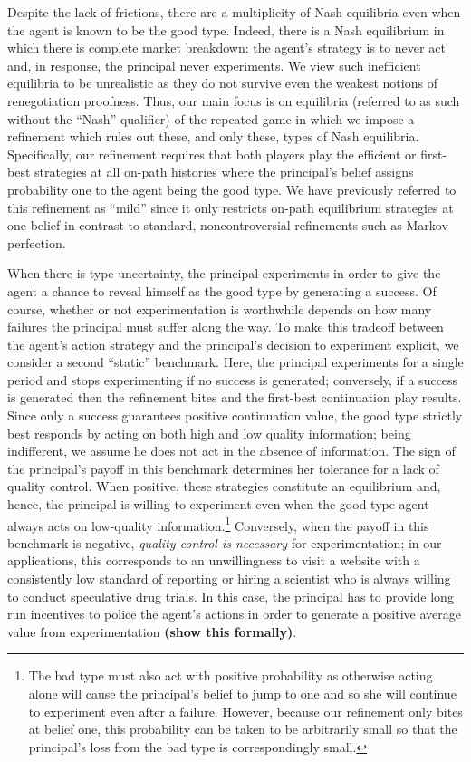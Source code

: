 \documentclass[11pt,reqno]{amsart}
\begin{document}
Despite the lack of frictions, there are a multiplicity of Nash equilibria even when the agent is known to be the good type. Indeed, there is a Nash equilibrium in which there is complete market breakdown: the agent's strategy is to never act and, in response, the principal never experiments. We view such inefficient equilibria to be unrealistic as they do not survive even the weakest notions of renegotiation proofness. Thus, our main focus is on equilibria (referred to as such without the ``Nash'' qualifier) of the repeated game in which we impose a refinement which rules out these, and only these, types of Nash equilibria. Specifically, our refinement requires that both players play the efficient or first-best strategies at all on-path histories where the principal's belief assigns probability one to the agent being the good type. We have previously referred to this refinement as ``mild'' since it only restricts on-path equilibrium strategies at one belief in contrast to standard, noncontroversial refinements such as Markov perfection.

When there is type uncertainty, the principal experiments in order to give the agent a chance to reveal himself as the good type by generating a success. Of course, whether or not experimentation is worthwhile depends on how many failures the principal must suffer along the way. To make this tradeoff between the agent's action strategy and the principal's decision to experiment explicit, we consider a second ``static'' benchmark. Here, the principal experiments for a single period and stops experimenting if no success is generated; conversely, if a success is generated then the refinement bites and the first-best continuation play results. Since only a success guarantees positive continuation value, the good type strictly best responds by acting on both high and low quality information; being indifferent, we assume he does not act in the absence of information. The sign of the principal's payoff in this benchmark determines her tolerance for a lack of quality control. When positive, these strategies constitute an equilibrium and, hence, the principal is willing to experiment even when the good type agent always acts on low-quality information.\footnote{The bad type must also act with positive probability as otherwise acting alone will cause the principal's belief to jump to one and so she will continue to experiment even after a failure. However, because our refinement only bites at belief one, this probability can be taken to be arbitrarily small so that the principal's loss from the bad type is correspondingly small.} Conversely, when the payoff in this benchmark is negative, \textit{quality control is necessary} for experimentation; in our applications, this corresponds to an unwillingness to visit a website with a consistently low standard of reporting or hiring a scientist who is always willing to conduct speculative drug trials. In this case, the principal has to provide long run incentives to police the agent's actions in order to generate a positive average value from experimentation \textbf{(show this formally)}.
\end{document}
